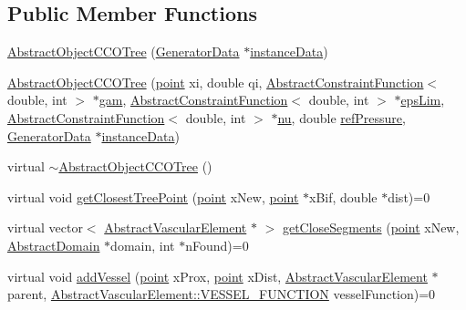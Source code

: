 \subsection*{Public Member Functions}
\begin{DoxyCompactItemize}
\item 
\hyperlink{class_abstract_object_c_c_o_tree_ac6be6b54f61f0db2dc79f47c4d1a1a3c}{Abstract\+Object\+C\+C\+O\+Tree} (\hyperlink{class_generator_data}{Generator\+Data} $\ast$\hyperlink{class_abstract_object_c_c_o_tree_aca7aecbd89dadc46dd9dce14cfde31e1}{instance\+Data})
\item 
\hyperlink{class_abstract_object_c_c_o_tree_aea1797e69828b7b55c11af20fb01ccd6}{Abstract\+Object\+C\+C\+O\+Tree} (\hyperlink{structpoint}{point} xi, double qi, \hyperlink{class_abstract_constraint_function}{Abstract\+Constraint\+Function}$<$ double, int $>$ $\ast$\hyperlink{class_abstract_object_c_c_o_tree_aad315b93744637e18153c4434dac067d}{gam}, \hyperlink{class_abstract_constraint_function}{Abstract\+Constraint\+Function}$<$ double, int $>$ $\ast$\hyperlink{class_abstract_object_c_c_o_tree_a62d3e1ff7e74a6236422273f58fc6012}{eps\+Lim}, \hyperlink{class_abstract_constraint_function}{Abstract\+Constraint\+Function}$<$ double, int $>$ $\ast$\hyperlink{class_abstract_object_c_c_o_tree_a92e6b6d1a2fac7331eee34fb28158828}{nu}, double \hyperlink{class_abstract_object_c_c_o_tree_ae7215e6237e4d04625a0c96be9f3578d}{ref\+Pressure}, \hyperlink{class_generator_data}{Generator\+Data} $\ast$\hyperlink{class_abstract_object_c_c_o_tree_aca7aecbd89dadc46dd9dce14cfde31e1}{instance\+Data})
\item 
virtual \hyperlink{class_abstract_object_c_c_o_tree_a4d8361714194b0dec0dbda97bec68d2b}{$\sim$\+Abstract\+Object\+C\+C\+O\+Tree} ()
\item 
virtual void \hyperlink{class_abstract_object_c_c_o_tree_a24a38d8d43726a9b4d61efaa2f0bf33c}{get\+Closest\+Tree\+Point} (\hyperlink{structpoint}{point} x\+New, \hyperlink{structpoint}{point} $\ast$x\+Bif, double $\ast$dist)=0
\item 
virtual vector$<$ \hyperlink{class_abstract_vascular_element}{Abstract\+Vascular\+Element} $\ast$ $>$ \hyperlink{class_abstract_object_c_c_o_tree_a7b370f8d39164e1f391a7cc2eb607302}{get\+Close\+Segments} (\hyperlink{structpoint}{point} x\+New, \hyperlink{class_abstract_domain}{Abstract\+Domain} $\ast$domain, int $\ast$n\+Found)=0
\item 
virtual void \hyperlink{class_abstract_object_c_c_o_tree_a8fa23ca2ea8b9933ce80c331cede89eb}{add\+Vessel} (\hyperlink{structpoint}{point} x\+Prox, \hyperlink{structpoint}{point} x\+Dist, \hyperlink{class_abstract_vascular_element}{Abstract\+Vascular\+Element} $\ast$parent, \hyperlink{class_abstract_vascular_element_a7d7b7863aae4952ba79a590ee65702ec}{Abstract\+Vascular\+Element\+::\+V\+E\+S\+S\+E\+L\+\_\+\+F\+U\+N\+C\+T\+I\+ON} vessel\+Function)=0

\end{DoxyCompactItemize}

